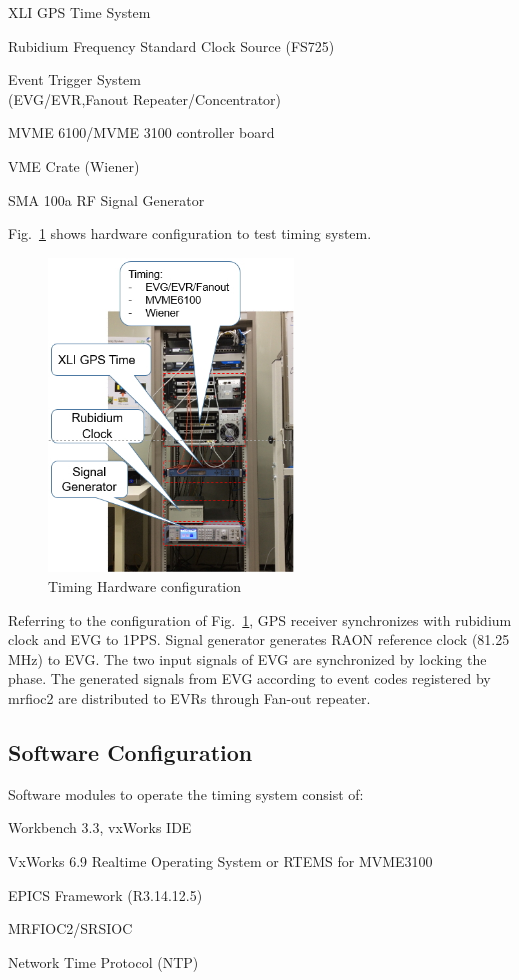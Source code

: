 \documentclass[a4paper,
              ]{jacow}
\begin{document}
\begin{Itemize}
	\item XLI GPS Time System
	\item Rubidium Frequency Standard Clock Source (FS725)
	\item Event Trigger System \\
	(EVG/EVR,Fanout Repeater/Concentrator)
	\item MVME 6100/MVME 3100 controller board 
	\item VME Crate (Wiener)
	\item SMA 100a RF Signal Generator
\end{Itemize}
\hfil\break
Fig.~\ref{timing:rack} shows hardware configuration to test timing system. 
\begin{figure}[!htb]
	\centering
	\includegraphics*[width=65mm]{timing_rack}
	\caption{Timing Hardware configuration }
	\label{timing:rack}
\end{figure}

Referring to the configuration of Fig.~\ref{timing:rack}, GPS receiver synchronizes with rubidium clock and EVG to 1PPS. Signal generator generates RAON reference clock (81.25 MHz) to EVG. The two input signals of EVG are synchronized by locking the phase. The generated signals from EVG according to event codes registered by mrfioc2 are distributed to EVRs through Fan-out repeater.

\subsection{Software Configuration}
Software modules to operate the timing system consist of:
\begin{Itemize}
	\item Workbench 3.3, vxWorks IDE
	\item VxWorks 6.9 Realtime Operating System or RTEMS for MVME3100
	\item EPICS Framework (R3.14.12.5)
	\item MRFIOC2/SRSIOC 
	\item Network Time Protocol (NTP)
\end{Itemize}
\end{document}

